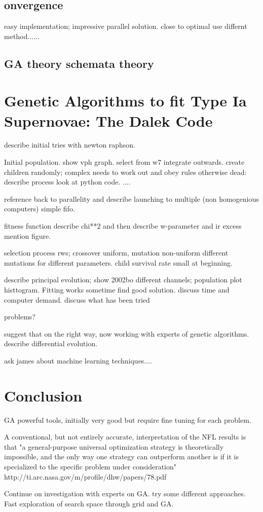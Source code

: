 \subsection{onvergence}

easy implementation; impressive parallel solution.
close to optimal use differnt method......
\subsection{GA theory schemata theory}



\section{Genetic Algorithms to fit Type Ia Supernovae: The Dalek Code}
\label{sec:geneticdalek}
describe initial tries with newton raphson. 

Initial population. show vph graph. select from w7 integrate outwards. create children randomly; complex needs to work out and obey rules otherwise dead: describe process look at python code. ....

reference back to  parallelity and describe launching to multiple (non homogenious computers) simple fifo. 

fitness function describe chi**2 and then describe w-parameter and ir excess mention figure.

selection process rws; crossover uniform, mutation non-uniform different mutations for different parameters. child survival rate small at beginning.

describe principal evolution; show 2002bo different channels; population plot histtogram.
Fitting works sometime find good solution. discuss time and computer demand. discuss what has been tried

problems?

suggest that on the right way, now working with experts of genetic algorithms. describe differential evolution. 

ask james about machine learning techniques....

\section{Conclusion}



GA powerful tools, initially very good but require fine tuning for each problem.

A conventional, but not entirely accurate, interpretation of the NFL results is that "a general-purpose universal optimization strategy is theoretically impossible, and the only way one strategy can outperform another is if it is specialized to the specific problem under consideration"
http://ti.arc.nasa.gov/m/profile/dhw/papers/78.pdf

Continue on investigation with experts on GA. try some different approaches. Fast exploration of search space through grid and GA. 






